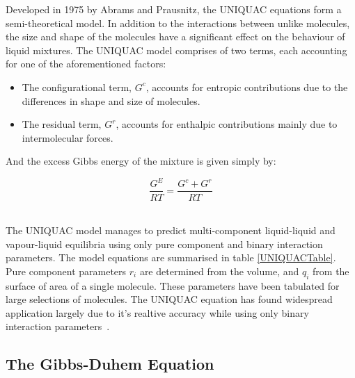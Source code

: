 Developed in 1975 by Abrams and Prausnitz, the UNIQUAC equations form a semi-theoretical model. In addition to the interactions between unlike molecules, the size and shape of the molecules have a significant effect on the behaviour of liquid mixtures. The UNIQUAC model comprises of two terms, each accounting for one of the aforementioned factors:~\cite{Dechema, ThermophysicalProperties, MolecularThermodynamicsOfFluidPhaseEquilibria, ThermodynamicModels, ActivityCoefficientModelApplicationUNI, UNIQUAC}\
\begin{itemize}
\item The configurational term, $G^{c}$, accounts for entropic contributions due to the differences in shape and size of molecules.\
\item The residual term, $G^{r}$, accounts for enthalpic contributions mainly due to intermolecular forces.\
\end{itemize}

And the excess Gibbs energy of the mixture is given simply by:\

\begin{equation}
\dfrac{G^{E}}{RT} = \dfrac{G^{c}+G^{r}}{RT}
\end{equation}\

The UNIQUAC model manages to predict multi-component liquid-liquid and vapour-liquid equilibria using only pure component and binary interaction parameters. The model equations are summarised in table \ref{UNIQUACTable}. Pure component parameters $r_{i}$ are determined from the volume, and $q_{i}$ from the surface of area of a single molecule. These parameters have been tabulated for large selections of molecules. The UNIQUAC equation has found widespread application largely due to it's realtive accuracy while using only binary interaction parameters~\cite{Dechema, ThermophysicalProperties, MolecularThermodynamicsOfFluidPhaseEquilibria, ActivityCoefficientModelApplicationUNI, StabilityAnalysis, ReliableComputationBinaryParams}.\

\subsection{The Gibbs-Duhem Equation}

